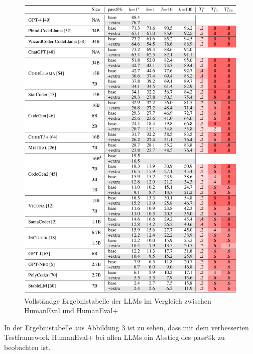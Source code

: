 \documentclass[fleqn,10pt]{wlscirep}
\begin{document}
\begin{figure}
    \centering
    \includegraphics[width=0.8\paperwidth]{image/resultshumaneval+full.png}
    \caption{Vollständge Ergebnistabelle der LLMs im Vergleich zwischen HumanEval und HumanEval+\cite{liu2024your}}
\end{figure}
In der Ergebnistabelle aus Abbildung 3 ist zu sehen, dass mit dem verbesserten Testframework HumanEval+ bei allen LLMs ein Abstieg des pass@k zu beobachten ist. 




\end{document}
